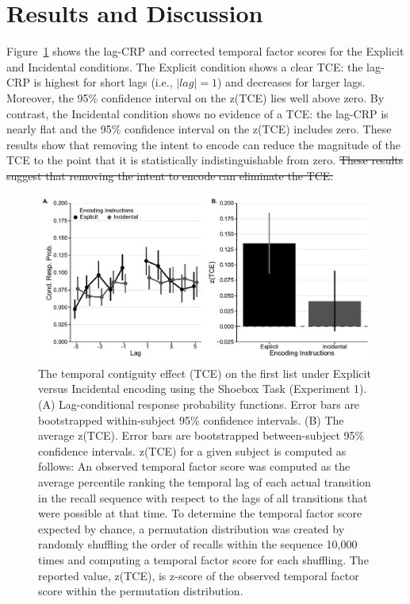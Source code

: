 \documentclass[man,natbib,floatsintext]{apa6} %
\begin{document}
\section{Results and Discussion}

Figure~\ref{e1_l1_crp} shows the lag-CRP and corrected temporal factor scores for the Explicit and Incidental conditions. The Explicit condition shows a clear TCE: the lag-CRP is highest for short lags (i.e., $|lag|=1$) and decreases for larger lags. Moreover, the 95\% confidence interval on the z(TCE) lies well above zero. By contrast, the Incidental condition shows no evidence of a TCE: the lag-CRP is nearly flat and the 95\% confidence interval on the z(TCE) includes zero. \color{red} These results show that removing the intent to encode can reduce the magnitude of the TCE to the point that it is statistically indistinguishable from zero.\color{black}  \st{These results suggest that removing the intent to encode can eliminate the TCE.}



\newcommand\paneltext{(A) Lag-conditional response probability functions. Error bars are bootstrapped within-subject 95\% confidence intervals. (B) The average z(TCE).  Error bars are bootstrapped between-subject 95\% confidence intervals. z(TCE) for a given subject is computed as follows: An observed temporal factor score was computed as the average percentile ranking the temporal lag of each actual transition in the recall sequence with respect to the lags of all transitions that were possible at that time. To determine the temporal factor score expected by chance, a permutation distribution was created by randomly shuffling the order of recalls within the sequence 10,000 times and computing a temporal factor score for each shuffling. The reported value, z(TCE), is z-score of the observed temporal factor score within the permutation distribution.}
\begin{figure}
\includegraphics{figures/E1_crp_list1.pdf}
\caption{The temporal contiguity effect (TCE) on the first list under Explicit versus Incidental encoding using the Shoebox Task (Experiment 1). \paneltext}
\label{e1_l1_crp}
\end{figure}
\end{document}
